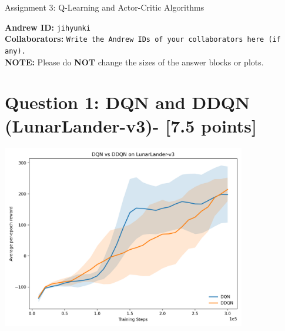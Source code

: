 \documentclass{article}
\begin{document}

\begin{centering}
    {\Large Assignment 3: Q-Learning and Actor-Critic Algorithms
} \\
    \vspace{.25cm}
\end{centering}
\vspace{0.25cm}

\textbf{Andrew ID:} \texttt{jihyunki} \\
\textbf{Collaborators:} \texttt{Write the Andrew IDs of your collaborators here (if any).}\\ 
\textbf{NOTE:} Please do \textbf{NOT} change the sizes of the answer blocks or plots.

\setcounter{section}{0}
\section{Question 1: DQN and DDQN (LunarLander-v3)- [7.5 points]}
\begin{answer}[title=Question 1,height=9.5cm,width=\linewidth]
\centering
\includegraphics[height=8cm]{q1_dqn_vs_ddqn.png}
\end{answer}
\end{document}
